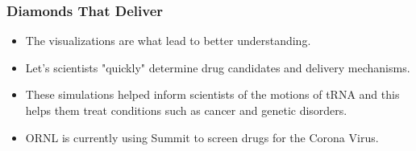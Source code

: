 \begin{frame}
\frametitle{Diamonds That Deliver}
    \begin{itemize}
        \item The visualizations are what lead to better understanding.
        \item Let's scientists "quickly" determine drug candidates and delivery
        mechanisms.
        \item These simulations helped inform scientists of the motions of tRNA
        and this helps them treat conditions such as cancer and genetic
        disorders.
        \item ORNL is currently using Summit to screen drugs for the Corona
        Virus.
    \end{itemize}
\end{frame}
